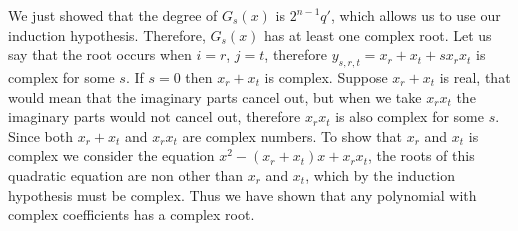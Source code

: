 \documentclass[12pt]{article}
\begin{document}
We just showed that the degree of $G_s(x)$ is $2^{n-1}q'$, which allows us to use our induction hypothesis.  Therefore, $G_s(x)$ has at least one complex root.  Let us say that the root occurs when $i=r$,  $j=t$, therefore $y_{s,r,t} = x_r + x_t +s x_r x_t$ is complex for some $s$.  If $s=0$ then $x_r + x_t$ is complex.  Suppose $x_r + x_t$ is real, that would mean that the imaginary parts cancel out, but when we take $x_r x_t$ the imaginary parts would not cancel out, therefore $x_r x_t$ is also complex for some $s$.  Since both $x_r+x_t$ and $x_r x_t$ are complex numbers.  To show that $x_r$ and $x_t$ is complex we consider the equation $x^2 - (x_r +x_t)x + x_r x_t$, the roots of this quadratic equation are non other than $x_r$ and $x_t$, which by the induction hypothesis must be complex.  Thus we have shown that any polynomial with complex coefficients has a complex root.



\end{document}
